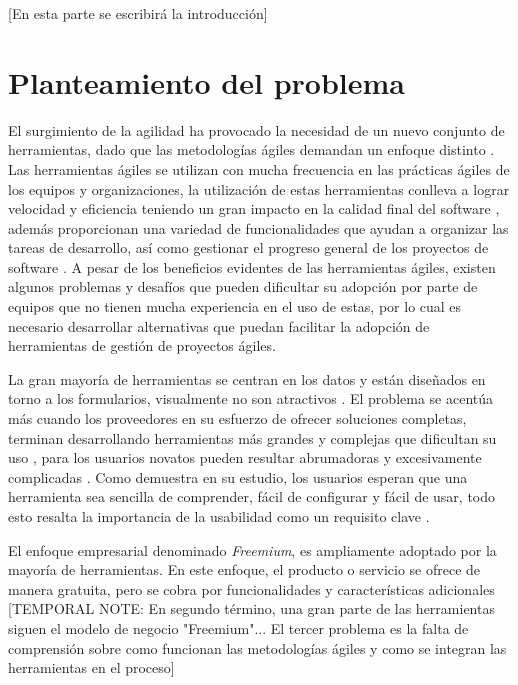 [En esta parte se escribirá la introducción]

\section{Planteamiento del problema}
El surgimiento de la agilidad ha provocado la necesidad de un nuevo conjunto de herramientas, dado que las metodologías ágiles demandan un enfoque distinto \parencite{mordi:2021}. Las herramientas ágiles se utilizan con mucha frecuencia en las prácticas ágiles de los equipos y organizaciones, la utilización de estas herramientas conlleva a lograr velocidad y eficiencia teniendo un gran impacto en la calidad final del software \parencite{ozkan_mishra:2019}, además proporcionan una variedad de funcionalidades que ayudan a organizar las tareas de desarrollo, así como gestionar el progreso general de los proyectos de software \parencite{alomar:2016}. A pesar de los beneficios evidentes de las herramientas ágiles, existen algunos problemas y desafíos que pueden dificultar su adopción por parte de equipos que no tienen mucha experiencia en el uso de estas, por lo cual es necesario desarrollar alternativas que puedan facilitar la adopción de herramientas de gestión de proyectos ágiles.

La gran mayoría de herramientas se centran en los datos y están diseñados en torno a los formularios, visualmente no son atractivos \parencite{mordi:2021}. El problema se acentúa más cuando los proveedores en su esfuerzo de ofrecer soluciones completas, terminan desarrollando herramientas más grandes y complejas que dificultan su uso \parencite{azizyan:2011, ozkan_mishra:2019}, para los usuarios novatos pueden resultar abrumadoras y excesivamente complicadas \parencite{mordi:2021}. Como demuestra \textcite{dimitrijevic:2015} en su estudio, los usuarios esperan que una herramienta sea sencilla de comprender, fácil de configurar y fácil de usar, todo esto resalta la importancia de la usabilidad como un requisito clave \parencite{mordi:2021}. 

El enfoque empresarial denominado \textit{Freemium}, es ampliamente adoptado por la mayoría de herramientas. En este enfoque, el producto o servicio se ofrece de manera gratuita, pero se cobra por funcionalidades y características adicionales \parencite{ferreira:2018} 
[TEMPORAL NOTE: En segundo término, una gran parte de las herramientas siguen el modelo de negocio "Freemium"... El tercer problema es la falta de comprensión sobre como funcionan las metodologías ágiles y como se integran las herramientas en el proceso] 

